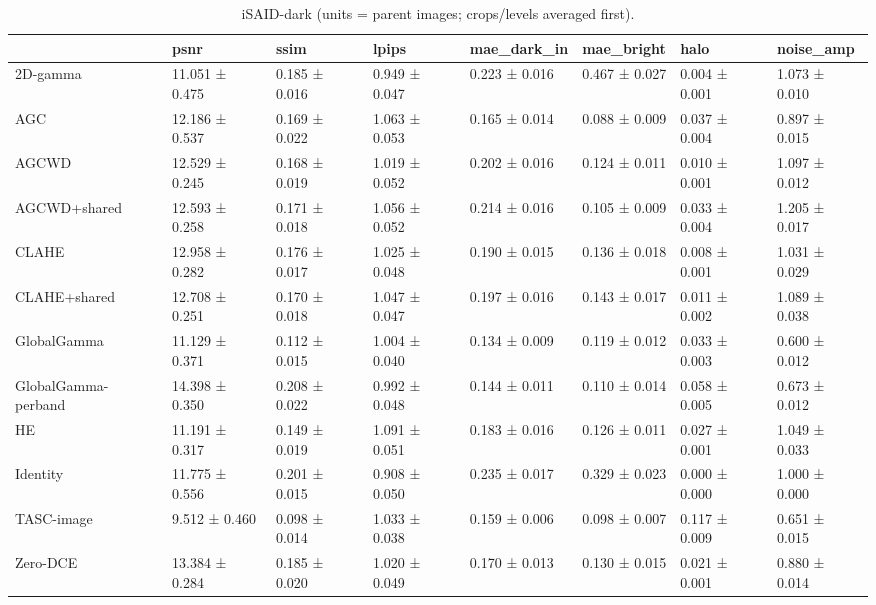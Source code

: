 \begin{table}[t]
\caption{iSAID-dark (units = parent images; crops/levels averaged first).}
\label{tab:isaid_summary}
\begin{tabular}{llllllll}
\toprule
 & psnr & ssim & lpips & mae\_dark\_in & mae\_bright & halo & noise\_amp \\
\midrule
2D-gamma & 11.051 ± 0.475 & 0.185 ± 0.016 & 0.949 ± 0.047 & 0.223 ± 0.016 & 0.467 ± 0.027 & 0.004 ± 0.001 & 1.073 ± 0.010 \\
AGC & 12.186 ± 0.537 & 0.169 ± 0.022 & 1.063 ± 0.053 & 0.165 ± 0.014 & 0.088 ± 0.009 & 0.037 ± 0.004 & 0.897 ± 0.015 \\
AGCWD & 12.529 ± 0.245 & 0.168 ± 0.019 & 1.019 ± 0.052 & 0.202 ± 0.016 & 0.124 ± 0.011 & 0.010 ± 0.001 & 1.097 ± 0.012 \\
AGCWD+shared & 12.593 ± 0.258 & 0.171 ± 0.018 & 1.056 ± 0.052 & 0.214 ± 0.016 & 0.105 ± 0.009 & 0.033 ± 0.004 & 1.205 ± 0.017 \\
CLAHE & 12.958 ± 0.282 & 0.176 ± 0.017 & 1.025 ± 0.048 & 0.190 ± 0.015 & 0.136 ± 0.018 & 0.008 ± 0.001 & 1.031 ± 0.029 \\
CLAHE+shared & 12.708 ± 0.251 & 0.170 ± 0.018 & 1.047 ± 0.047 & 0.197 ± 0.016 & 0.143 ± 0.017 & 0.011 ± 0.002 & 1.089 ± 0.038 \\
GlobalGamma & 11.129 ± 0.371 & 0.112 ± 0.015 & 1.004 ± 0.040 & 0.134 ± 0.009 & 0.119 ± 0.012 & 0.033 ± 0.003 & 0.600 ± 0.012 \\
GlobalGamma-perband & 14.398 ± 0.350 & 0.208 ± 0.022 & 0.992 ± 0.048 & 0.144 ± 0.011 & 0.110 ± 0.014 & 0.058 ± 0.005 & 0.673 ± 0.012 \\
HE & 11.191 ± 0.317 & 0.149 ± 0.019 & 1.091 ± 0.051 & 0.183 ± 0.016 & 0.126 ± 0.011 & 0.027 ± 0.001 & 1.049 ± 0.033 \\
Identity & 11.775 ± 0.556 & 0.201 ± 0.015 & 0.908 ± 0.050 & 0.235 ± 0.017 & 0.329 ± 0.023 & 0.000 ± 0.000 & 1.000 ± 0.000 \\
TASC-image & 9.512 ± 0.460 & 0.098 ± 0.014 & 1.033 ± 0.038 & 0.159 ± 0.006 & 0.098 ± 0.007 & 0.117 ± 0.009 & 0.651 ± 0.015 \\
Zero-DCE & 13.384 ± 0.284 & 0.185 ± 0.020 & 1.020 ± 0.049 & 0.170 ± 0.013 & 0.130 ± 0.015 & 0.021 ± 0.001 & 0.880 ± 0.014 \\
\bottomrule
\end{tabular}
\end{table}
